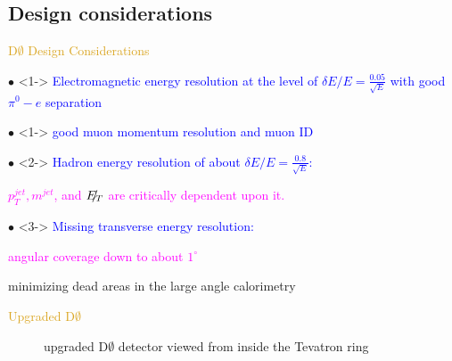 \subsection{Design considerations}
\begin{frame}{\textcolor{Goldenrod}{D$\emptyset$ Design Considerations}}
  \itt
\item[$\bullet$]<1-> \textcolor{blue}{Electromagnetic energy resolution at the level of $\delta E / E
    = \frac{0.05}{\sqrt{E}}$ with good $\pi^0-e $ separation}
  
\item[$\bullet$]<1-> \textcolor{blue}{good muon momentum resolution and
    muon ID}
\item[$\bullet$]<2-> \textcolor{Blue}{Hadron energy resolution of about $\delta E / E
    = \frac{0.8}{\sqrt{E}}$:}
  {\small
    \itt
  \item \textcolor{Magenta}{$p^{jet}_T, m^{jet}$, and $\slashed{E_{T}}$ are critically
      dependent upon it.}
    \tti
  }
\item[$\bullet$]<3-> \textcolor{Blue}{Missing transverse energy resolution:}
  {\small 
    \itt
    
  \item \textcolor{Magenta}{angular coverage down to about $1^{\circ}$}
    
  \item minimizing dead areas in the large angle calorimetry
    \tti
  }
  \tti   
\end{frame}

\begin{frame}{\textcolor{Goldenrod}{Upgraded D$\emptyset$}}
  \begin{figure}[h]
    \caption*{upgraded D$\emptyset$ detector viewed from inside the Tevatron ring}
  \end{figure}
\end{frame}

